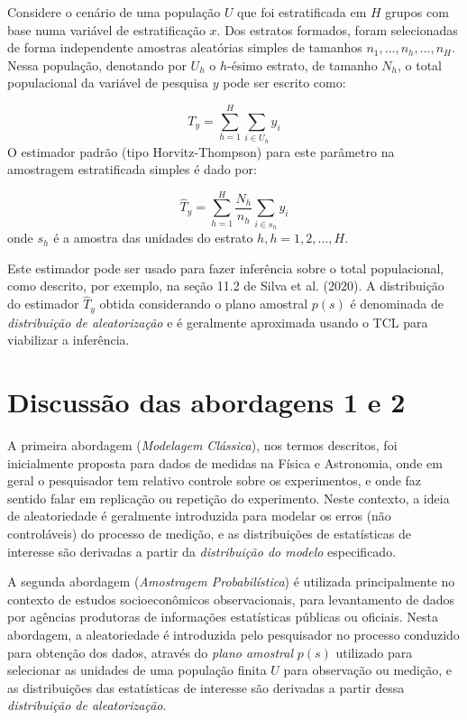 \documentclass[
  12pt,
  brazilian,
]{book}
\theoremstyle{definition}
\theoremstyle{definition}
\theoremstyle{definition}
\theoremstyle{definition}
\theoremstyle{remark}
\begin{document}
Considere o cenário de uma população \(U\) que foi estratificada em \(H\) grupos com base numa variável de estratificação \(x\). Dos estratos formados, foram selecionadas de forma independente amostras aleatórias simples de tamanhos \(n_1, \ldots, n_h, \ldots, n_H\). Nessa população, denotando por \(U_h\) o \(h\)-ésimo estrato, de tamanho \(N_h\), o total populacional da variável de pesquisa \(y\) pode ser escrito como:

\begin{equation}
T_y = \sum_{h=1}^H \sum_{i \in U_h} y_i \label{eq:ref1}
\end{equation}
O estimador padrão (tipo Horvitz-Thompson) para este parâmetro na amostragem estratificada simples é dado por:

\begin{equation}
\widehat {T}_y = \sum_{h=1}^H \frac{N_h}{n_h} \sum_{i \in s_h} y_i \label{eq:ref2}
\end{equation}
onde \(s_h\) é a amostra das unidades do estrato \(h, h=1, 2,\dots,H\).

Este estimador pode ser usado para fazer inferência sobre o total populacional, como descrito, por exemplo, na seção 11.2 de Silva et al. (2020). A distribuição do estimador \(\widehat {T}_y\) obtida considerando o plano amostral \(p(s)\) é denominada de \emph{distribuição de aleatorização} e é geralmente aproximada usando o TCL para viabilizar a inferência.

\hypertarget{discussuxe3o-das-abordagens-1-e-2}{%
\section{Discussão das abordagens 1 e 2}\label{discussuxe3o-das-abordagens-1-e-2}}

A primeira abordagem (\emph{Modelagem Clássica}), nos termos descritos, foi
inicialmente proposta para dados de medidas na Física e Astronomia, onde em
geral o pesquisador tem relativo controle sobre os experimentos, e onde faz
sentido falar em replicação ou repetição do experimento. Neste contexto, a ideia
de aleatoriedade é geralmente introduzida para modelar os erros (não
controláveis) do processo de medição, e as distribuições de estatísticas de
interesse são derivadas a partir da \emph{distribuição do modelo} especificado.

A segunda abordagem (\emph{Amostragem Probabilística}) é utilizada principalmente
no contexto de estudos socioeconômicos observacionais, para levantamento de
dados por agências produtoras de informações estatísticas públicas ou oficiais. Nesta abordagem, a aleatoriedade é introduzida pelo pesquisador no processo conduzido para obtenção dos dados, através do \emph{plano amostral} \(p(s)\) utilizado para selecionar as unidades de uma população finita \(U\) para observação ou medição, e as distribuições das estatísticas de interesse são derivadas a
partir dessa \emph{distribuição de aleatorização}.
\end{document}
